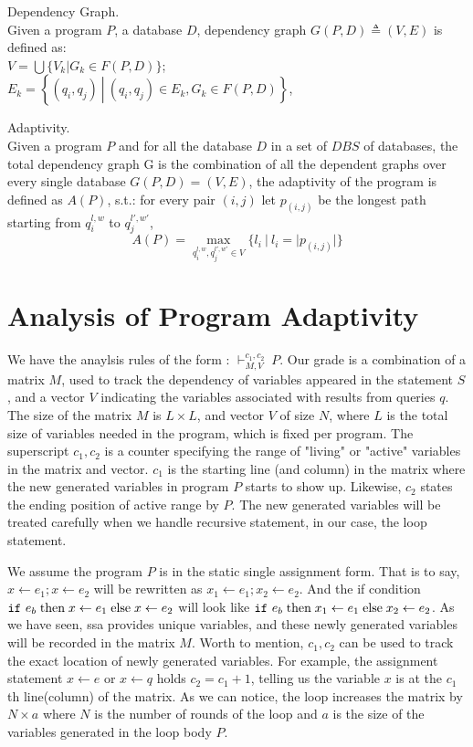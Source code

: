 \documentclass[a4paper,11pt]{article}
\begin{document}
\begin{defn}
Dependency Graph.
\\
Given a program $P$, a database $D$, 
dependency graph $G(P, D) \triangleq (V, E)$ is defined as: 
\\
$V =\bigcup \{V_k | G_k \in F(P, D)  \}$;
\\
$E_k = \left\{(q_i,q_j) 
~ \left \vert ~ (q_i,q_j) \in E_k , G_k \in F(P, D) \right.\right\}$,
\end{defn}
%
%
\begin{defn}
Adaptivity.
\\
Given a program $P$ and for all the database $D$ in a set of $DBS$ of databases, the total dependency graph G is the combination of all the dependent graphs over every single database $G(P, D) = (V, E)$, the adaptivity of the program is defined as $A(P)$, s.t.:
for every pair $(i,j)$ let $p_{(i,j)}$ be the longest path starting from $q_i^{l, w}$ to $q_j^{l',w'}$,
%
$$A(P) = \max\limits_{q_i^{l,w},q_j^{l',w'} \in V }\{l_i ~|~ l_i = |p_(i,j)| \}$$
\end{defn}
%
%
\section{Analysis of Program Adaptivity}
We have the anaylsis rules of the form : $\vdash^{c_1, c_2}_{M,V} ~ P$.  Our grade is a combination of a matrix $M$, used to track the dependency of variables appeared in the statement $S$, and a vector $V$ indicating the variables associated with results from queries $q$. The size of the matrix $M$ is $L \times L$, and vector $V$ of size $N$, where $L$ is the total size of variables needed in the program, which is fixed per program. 
The superscript $c_1,c_2$ is a counter specifying the range of "living" or "active" variables in the matrix and vector. $c_1$ is the starting line (and column) in the matrix where the new generated variables  in program $P$ starts to show up. Likewise, $c_2$ states the ending position of active range by $P$. The new generated variables will be treated carefully when we handle recursive statement, in our case, the loop statement. 

We assume the program $P$ is in the static single assignment form. That is to say, $x \leftarrow e_1; x \leftarrow e_2 $ will be rewritten as $ x_1 \leftarrow e_1; x_2 \leftarrow e_2$. And the if condition $ \mathtt{if} ~ e_b \mbox{\;then\;} x \leftarrow e_1 \mbox{\;else\;} x \leftarrow e_2  $ will look like $ \mathtt{if} ~ e_b \mbox{\;then\;} x_1 \leftarrow e_1 \mbox{\;else\;} x_2 \leftarrow e_2  $. As we have seen, ssa provides unique variables, and these newly generated variables will be recorded in the matrix $M$. Worth to mention, $c_1,c_2$ can be used to track the exact location of newly generated variables. For example, the assignment statement $x \leftarrow e$ or $x \leftarrow q $ holds $c_2 =c_1+1$, telling us the variable $x$ is at the $c_1$th line(column) of the matrix. As we can notice, the loop increases the matrix by $N \times a$ where $N$ is the number of rounds of the loop and $a$ is the size of the variables generated in the loop body $P$.
\end{document}
